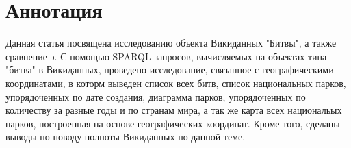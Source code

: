 \section{Аннотация}

Данная статья посвящена исследованию объекта Викиданных "Битвы", а также сравнение э. С помощью SPARQL-запросов, вычисляемых на объектах типа "битва" в Викиданных, проведено исследование, связанное с географическими координатами, в которм выведен список всех битв, список национальных парков, упорядоченных по дате создания, диаграмма парков, упорядоченных по количеству за разные годы и по странам мира, а так же карта всех национальых парков, построенная на основе географических координат. Кроме того, сделаны выводы по поводу полноты Викиданных по данной теме.